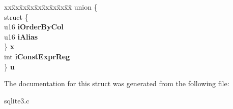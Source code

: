 \begin{DoxyCompactItemize}
\item 
\begin{tabbing}
xx\=xx\=xx\=xx\=xx\=xx\=xx\=xx\=xx\=\kill
union \{\\
\>struct \{\\
\>\>u16 {\bfseries iOrderByCol}\\
\>\>u16 {\bfseries iAlias}\\
\>\} {\bfseries x}\\
\>int {\bfseries iConstExprReg}\\
\} {\bfseries u}\hypertarget{structExprList_1_1ExprList__item_a7bce1eb19061edb080a38a6b826fd789}{}\label{structExprList_1_1ExprList__item_a7bce1eb19061edb080a38a6b826fd789}
\\

\end{tabbing}\end{DoxyCompactItemize}


The documentation for this struct was generated from the following file\+:\begin{DoxyCompactItemize}
\item 
sqlite3.\+c\end{DoxyCompactItemize}
